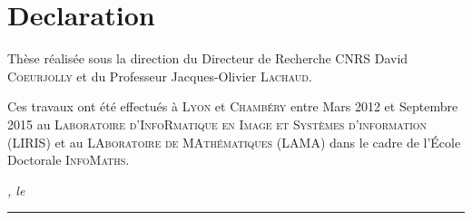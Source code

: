 %
\chapter*{Declaration}
\label{sec:declaration}
\thispagestyle{empty}

\bigskip
\vfill

\noindent Thèse réalisée sous la direction du Directeur de Recherche CNRS David
\textsc{Coeurjolly} et du Professeur Jacques-Olivier \textsc{Lachaud}.

\noindent Ces travaux ont été effectués à \textsc{Lyon} et \textsc{Chambéry}
entre Mars 2012 et Septembre 2015 au \textsc{Laboratoire d'InfoRmatique en Image
et Systèmes d'information} (\textsc{LIRIS}) et au \textsc{LAboratoire de
MAthématiques} (\textsc{LAMA}) dans le cadre de l'École Doctorale
\textsc{InfoMaths}.

\noindent\textit{\thesisUniversityCity, le \thesisDate}

\smallskip




\begin{flushright}
	\begin{minipage}{5cm}
		\rule{\textwidth}{1pt}
	\end{minipage}\\
	\begin{minipage}{8cm}
		\centering\thesisTitle
	\end{minipage}
\end{flushright}




